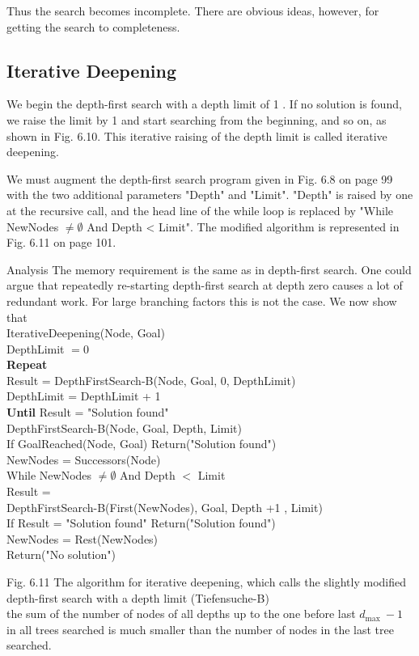 \documentclass[10pt]{book}
\begin{document}
Thus the search becomes incomplete. There are obvious ideas, however, for getting the search to completeness.


\subsection{Iterative Deepening}
We begin the depth-first search with a depth limit of 1 . If no solution is found, we raise the limit by 1 and start searching from the beginning, and so on, as shown in Fig. 6.10. This iterative raising of the depth limit is called iterative deepening.

We must augment the depth-first search program given in Fig. 6.8 on page 99 with the two additional parameters "Depth" and "Limit". "Depth" is raised by one at the recursive call, and the head line of the while loop is replaced by "While NewNodes $\neq \emptyset$ And Depth < Limit". The modified algorithm is represented in Fig. 6.11 on page 101.

Analysis The memory requirement is the same as in depth-first search. One could argue that repeatedly re-starting depth-first search at depth zero causes a lot of redundant work. For large branching factors this is not the case. We now show that\\
IterativeDeepening(Node, Goal)\\
DepthLimit $=0$\\
\textbf{Repeat}\\
Result = DepthFirstSearch-B(Node, Goal, 0, DepthLimit)\\
DepthLimit = DepthLimit + 1\\
\textbf{Until} Result = "Solution found"\\
DepthFirstSearch-B(Node, Goal, Depth, Limit)\\
If GoalReached(Node, Goal) Return("Solution found")\\
NewNodes = Successors(Node)\\
While NewNodes $\neq \emptyset$ And Depth $<$ Limit\\
Result =\\
DepthFirstSearch-B(First(NewNodes), Goal, Depth +1 , Limit)\\
If Result = "Solution found" Return("Solution found")\\
NewNodes = Rest(NewNodes)\\
Return("No solution")

Fig. 6.11 The algorithm for iterative deepening, which calls the slightly modified depth-first search with a depth limit (Tiefensuche-B)\\
the sum of the number of nodes of all depths up to the one before last $d_{\text {max }}-1$ in all trees searched is much smaller than the number of nodes in the last tree searched.
\end{document}
